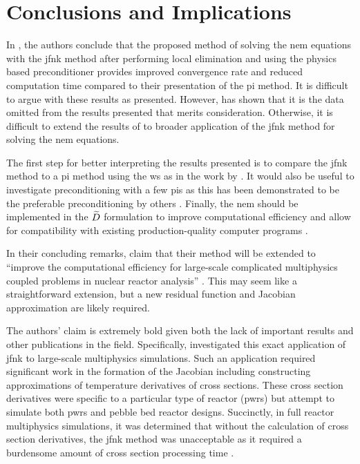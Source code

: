 \section{Conclusions and Implications}
\label{sec:conclusion}

  In , the authors conclude that the proposed method of
  solving the \gls{nem} equations with the \gls{jfnk} method after performing 
  local elimination and using the physics based preconditioner provides improved
  convergence rate and reduced computation time compared to their presentation
  of the \gls{pi} method. It is difficult to argue with these results as
  presented. However,  has shown that it is the data omitted
  from the results presented that merits consideration. Otherwise, it is
  difficult to extend the results of \citeauthor{qe2paper} to broader
  application of the \gls{jfnk} method for solving the \gls{nem} equations.

  The first step for better interpreting the results presented is to compare the
  \gls{jfnk} method to a \gls{pi} method using the \gls{ws} as in the work by
  \citeauthor{jfnk_wielandt}. It would also be useful to investigate
  preconditioning with a few \glspl{pi} as this has been demonstrated to be the
  preferable preconditioning by others \cite{gill_azmy,jfnk_wielandt}. Finally,
  the \gls{nem} should be implemented in the $\widetilde{D}$ formulation to improve
  computational efficiency and allow for compatibility with existing
  production-quality computer programs \cite{palmtagThesis,smith_nonlinear}.

  In their concluding remarks, \citeauthor{qe2paper} claim that their method
  will be extended to ``improve the computational efficiency for large-scale
  complicated multiphysics coupled problems in nuclear reactor analysis''
  \cite{qe2paper}. This may seem like a straightforward extension, but a new
  residual function and Jacobian approximation are likely required.

  The authors' claim is extremely bold given both the lack of important results
  and other publications in the field. Specifically, \citeauthor{caslJFNK}
  investigated this exact application of \gls{jfnk} to large-scale multiphysics
  simulations. Such an application required significant work in the formation of
  the Jacobian including constructing approximations of temperature derivatives
  of cross sections. These cross section derivatives were specific to a
  particular type of reactor (\glspl{pwr}) but \citeauthor{qe2paper} attempt to
  simulate both \glspl{pwr} and pebble bed reactor designs. Succinctly, in
  full reactor multiphysics simulations, it was determined that without the
  calculation of cross section derivatives, the \gls{jfnk} method was
  unacceptable as it required a burdensome amount of cross section processing 
  time \cite{caslJFNK}.


